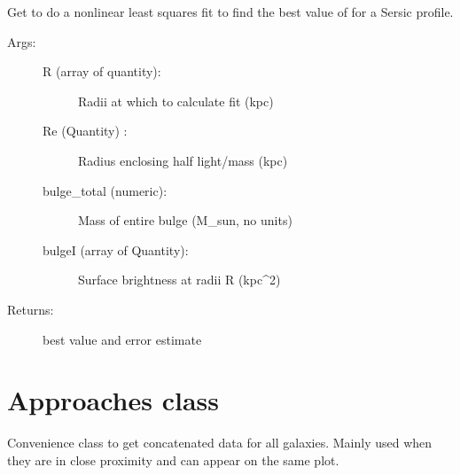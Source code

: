 \documentclass[letterpaper,10pt,english]{sphinxmanual}
\begin{document}
\begin{fulllineitems}
\begin{fulllineitems}
\label{\detokenize{remnant:galaxy.remnant.Remnant.fit_sersic_n}}
Get  to do a non\sphinxhyphen{}linear least squares fit to find
the best value of  for a Sersic profile.
\begin{description}
\item[{Args:}] \leavevmode\begin{description}
\item[{R (array of quantity):}] \leavevmode
Radii at which to calculate fit (kpc)

\item[{Re (Quantity) :}] \leavevmode
Radius enclosing half light/mass (kpc)

\item[{bulge\_total (numeric):}] \leavevmode
Mass of entire bulge (M\_sun, no units)

\item[{bulgeI (array of Quantity):}] \leavevmode
Surface brightness at radii R (kpc\textasciicircum{}\sphinxhyphen{}2)

\end{description}

\item[{Returns:}] \leavevmode
best  value and error estimate

\end{description}

\end{fulllineitems}


\end{fulllineitems}

\label{\detokenize{approaches:module-galaxy.approaches}}

\chapter{Approaches class}
\label{\detokenize{approaches:approaches-class}}\label{\detokenize{approaches::doc}}
Convenience class to get concatenated data for all galaxies.
Mainly used when they are in close proximity and can appear on the same plot.
\end{document}
